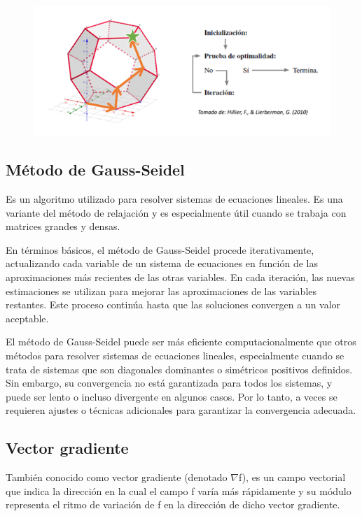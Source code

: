 \documentclass[conference]{IEEEtran}
\begin{document}
\begin{figure}[H]
    \begin{center}
        \includegraphics[width=\linewidth]{./Images/MetodoSimplex2.png}
        \caption{}
    \end{center}
\end{figure}

\subsection{Método de Gauss-Seidel}

Es un algoritmo utilizado para resolver sistemas de ecuaciones lineales. Es 
una variante del método de relajación y es especialmente útil cuando se 
trabaja con matrices grandes y densas.

En términos básicos, el método de Gauss-Seidel procede iterativamente, 
actualizando cada variable de un sistema de ecuaciones en función de las 
aproximaciones más recientes de las otras variables. En cada iteración, las 
nuevas estimaciones se utilizan para mejorar las aproximaciones de las 
variables restantes. Este proceso continúa hasta que las soluciones convergen 
a un valor aceptable.

El método de Gauss-Seidel puede ser más eficiente computacionalmente que 
otros métodos para resolver sistemas de ecuaciones lineales, especialmente 
cuando se trata de sistemas que son diagonales dominantes o simétricos 
positivos definidos. Sin embargo, su convergencia no está garantizada para 
todos los sistemas, y puede ser lento o incluso divergente en algunos casos. 
Por lo tanto, a veces se requieren ajustes o técnicas adicionales para 
garantizar la convergencia adecuada.

\subsection{Vector gradiente}

También conocido como vector gradiente (denotado $\nabla$f), es un 
campo vectorial que indica la dirección en la cual el campo f varía más 
rápidamente y su módulo representa el ritmo de variación de f en la dirección 
de dicho vector gradiente.
\end{document}

